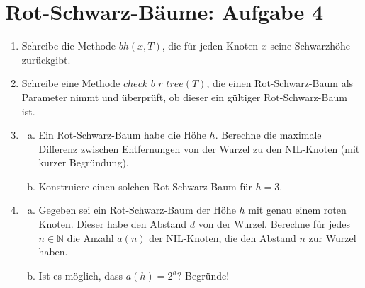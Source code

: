 \documentclass{scrartcl}
\newcommand{\rbt}{Rot-Schwarz-Baum }
\begin{document}
\section*{Rot-Schwarz-Bäume: Aufgabe 4}
\begin{enumerate}[(1)]

\item Schreibe die Methode $bh(x,T)$, die f\"ur jeden Knoten $x$ seine Schwarzh\"ohe zur\"uckgibt.

\item Schreibe eine Methode $check\_b\_r\_tree(T)$, die einen \rbt als Parameter nimmt und \"uberpr\"uft, ob dieser ein g\"ultiger \rbt ist.

\item \begin{enumerate}[(a)]
\item Ein \rbt habe die H\"ohe $h$. Berechne die maximale Differenz zwischen Entfernungen von der Wurzel zu den NIL-Knoten (mit kurzer Begr\"undung).
\item Konstruiere einen solchen \rbt f\"ur $h=3$.
\end{enumerate}

\item \begin{enumerate}[(a)]
\item Gegeben sei ein \rbt der H\"ohe $h$ mit genau einem roten Knoten. Dieser habe den Abstand $d$ von der Wurzel.
Berechne f\"ur jedes $n\in \mathbb{N}$ die Anzahl $a(n)$ der NIL-Knoten, die den Abstand $n$ zur Wurzel haben.
\item Ist es m\"oglich, dass $a(h)=2^h$? Begr\"unde!
\end{enumerate}

\end{enumerate}
\end{document}
